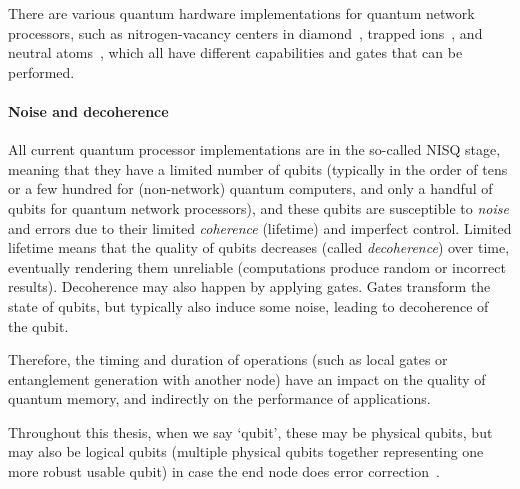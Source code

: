 There are various quantum hardware implementations for quantum network processors, such as nitrogen-vacancy centers in diamond~\cite{pompili2021realization}, trapped ions~\cite{krutyanskiy2023entanglement}, and neutral atoms~\cite{hofmann2012heralded,ritter2012elementary}, which all have different capabilities and gates that can be performed.

\paragraph{Noise and decoherence}
All current quantum processor implementations are in the so-called \acf{NISQ} stage, meaning that they have a limited number of qubits (typically in the order of tens or a few hundred for (non-network) quantum computers, and only a handful of qubits for quantum network processors), and these qubits are susceptible to \emph{noise} and errors due to their limited \emph{coherence} (lifetime) and imperfect control.
Limited lifetime means that the quality of qubits decreases (called \emph{decoherence}) over time, eventually rendering them unreliable (computations produce random or incorrect results).
Decoherence may also happen by applying gates.
Gates transform the state of qubits, but typically also induce some noise, leading to decoherence of the qubit.

Therefore, the timing and duration of operations (such as local gates or entanglement generation with another node) have an impact on the quality of quantum memory, and indirectly on the performance of applications.

Throughout this thesis, when we say `qubit', these may be physical qubits, but may also be logical qubits (multiple physical qubits together representing one more robust usable qubit) in case the end node does error correction~\cite{lidar2013quantum}.







